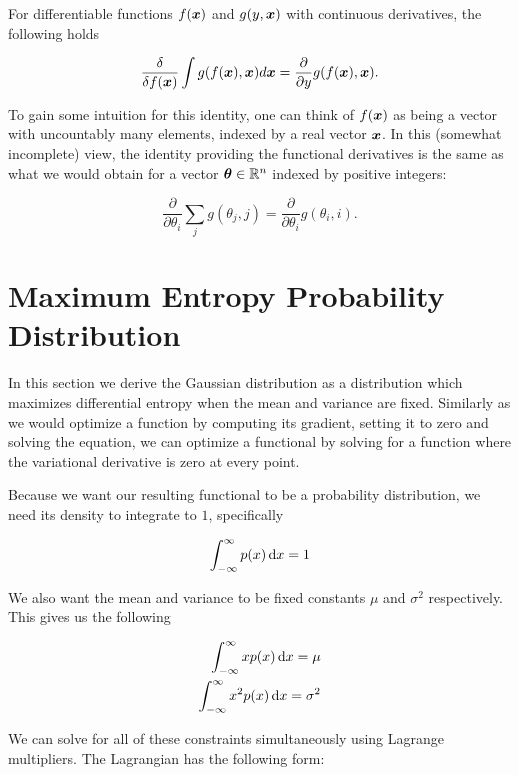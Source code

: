 For differentiable functions $f({\bm{x}})$ and $g(y, {\bm{x}})$ with continuous derivatives, the following holds

\begin{equation}
\frac{\delta}{\delta f({\bm{x}})} \int g(f({\bm{x}}), {\bm{x}}) d {\bm{x}} = \frac{\partial}{\partial y} g(f({\bm{x}}), {\bm{x}}).
\end{equation}

 To gain some intuition for this identity, one can think of $f({\bm{x}})$ as being a vector with uncountably many elements, indexed by a real vector ${\bm{x}}$. In this (somewhat incomplete) view, the identity providing the functional derivatives is the same as what we would obtain for a vector ${\bm{\theta}} \in {\mathbb{R}}^n$ indexed by positive integers:

\begin{equation}
\frac{\partial}{\partial \theta_i} \sum_j g(\theta_j, j) = \frac{\partial}{\partial \theta_i} g(\theta_i, i).
\end{equation}

\section{Maximum Entropy Probability Distribution}

In this section we derive the Gaussian distribution as a distribution which maximizes differential entropy when the mean and variance are fixed. Similarly as we would optimize a function by computing its gradient, setting it to zero and solving the equation, we can optimize a functional by solving for a function where the variational derivative is zero at every point.

Because we want our resulting functional to be a probability distribution, we need its density to integrate to $1$, specifically

\begin{equation}
\int_{-\infty}^{\infty} p(x) \mathop{}\!\mathrm{d} x = 1
\end{equation}

We also want the mean and variance to be fixed constants $\mu$ and $\sigma^2$ respectively. This gives us the following

\begin{align}
\int_{-\infty}^{\infty} x p(x) \mathop{}\!\mathrm{d} x = \mu \\
\int_{-\infty}^{\infty} x^2 p(x) \mathop{}\!\mathrm{d} x = \sigma^2
\end{align}

We can solve for all of these constraints simultaneously using Lagrange multipliers. The Lagrangian has the following form:

